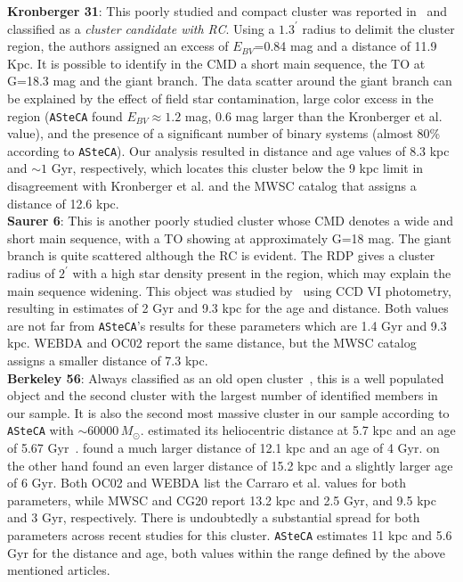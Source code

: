 \documentclass{aa}
\begin{document}
  \textbf{Kronberger 31}: This poorly studied and compact cluster was reported
  in~\cite{Kronberger_2006} and classified as a \emph{cluster candidate with
  RC}. Using a $1.3^{\prime}$ radius to delimit the cluster region, the authors
  assigned an excess of $E_{BV}$=0.84 mag and a distance of 11.9 Kpc.
  It is possible to identify in the CMD a short main sequence, the TO at G=18.3
  mag and the giant branch. The data scatter around the giant branch can be
  explained by the effect of field star contamination, large color excess in the
  region (\texttt{ASteCA} found $E_{BV}\approx1.2$ mag, 0.6 mag larger than the
  Kronberger et al. value), and the presence of a significant number of binary
  systems (almost 80\% according to \texttt{ASteCA}). Our analysis resulted in
  distance and age values of 8.3 kpc and $\sim1$ Gyr, respectively, which
  locates this cluster below the 9 kpc limit in disagreement with Kronberger et
  al. and the MWSC catalog that assigns a distance of 12.6 kpc.\\

  \textbf{Saurer 6}: This is another poorly studied cluster whose CMD denotes a
  wide and short main sequence, with a TO showing at approximately G=18 mag. The
  giant branch is quite scattered although the RC is evident.
  The RDP gives a cluster radius of $2^{\prime}$ with a high star density
  present in the region, which may explain the main sequence widening.
  This object was studied by~\cite{Frinchaboy_2002} using CCD VI photometry,
  resulting in estimates of 2 Gyr and 9.3 kpc for the age and distance.
  Both values are not far from \texttt{ASteCA}'s results for these parameters
  which are 1.4 Gyr and 9.3 kpc. WEBDA and OC02 report the same distance, but
  the MWSC catalog assigns a smaller distance of 7.3 kpc.\\

  \textbf{Berkeley 56}: Always classified as an old open
  cluster~\citep[see for example][]{King_1964}, this is a well populated object
  and the second cluster with the largest number of identified members in our
  sample. It is also the second most massive cluster in our sample according
  to \texttt{ASteCA} with $\sim60000\,M_{\odot}$.
  \cite{Janes_1994} estimated its heliocentric distance at 5.7 kpc and an age of
  5.67 Gyr~\citep[according to][]{Salaris_2004}. \cite{Carraro_2006} found a
  much larger distance of 12.1 kpc and an age of 4 Gyr. \cite{Janes_2011} on the
  other hand found an even larger distance of 15.2 kpc and a slightly larger age
  of 6 Gyr.
  Both OC02 and WEBDA list the Carraro et al. values for both parameters, while
  MWSC and CG20 report 13.2 kpc and 2.5 Gyr, and 9.5 kpc and 3
  Gyr, respectively. There is undoubtedly a substantial spread for both
  parameters across recent studies for this cluster.
  \texttt{ASteCA} estimates 11 kpc and 5.6 Gyr for the distance and age,
  both values within the range defined by the above mentioned articles.\\
\end{document}
